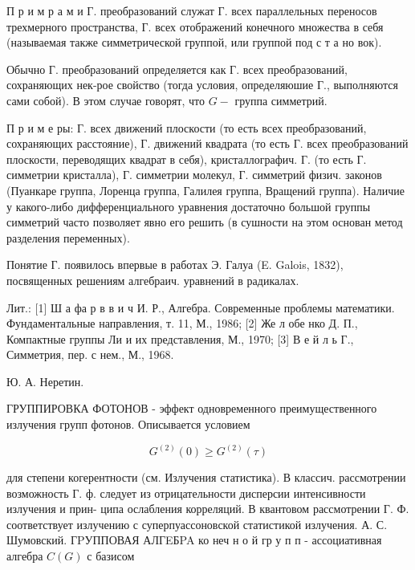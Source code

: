 \documentclass[10pt]{article}
\begin{document}
П р и м р а м и Г. преобразований служат Г. всех параллельных переносов трехмерного пространства, Г. всех отображений конечного множества в себя (называемая также симметрической группой, или группой под с т а но вок).



Обычно Г. преобразований определяется как Г. всех преобразований, сохраняющих нек-рое свойство (тогда условия, определяюшие Г., выполняются сами собой). В этом случае говорят, что $G-$ группа симметрий.



П р и м е ры: Г. всех движений плоскости (то есть всех преобразований, сохраняющих расстояние), Г. движений квадрата (то есть Г. всех преобразований плоскости, переводящих квадрат в себя), кристаллографич. Г. (то есть Г. симметрии кристалла), Г. симметрии молекул, Г. симметрий физич. законов (Пуанкаре группа, Лоренца группа, Галилея группа, Вращений группа). Наличие у какого-либо дифференциального уравнения достаточно большой группы симметрий часто позволяет явно его решить (в сушности на этом основан метод разделения переменных).



Понятие Г. появилось впервые в работах Э. Галуа (E. Galois, 1832), посвященных решениям алгебраич. уравнений в радикалах.



Лит.: [1] Ш а фа р в в и ч И. Р., Алгебра. Современные проблемы математики. Фундаментальные направления, т. 11, М., 1986; [2] Же л обе нко Д. П., Компактные группы Ли и их представления, М., 1970; [3] В е й л ь Г., Симметрия, пер. с нем., М., 1968.



Ю. А. Неретин.



ГРУППИРОВКА ФОТОНОВ - эффект одновременного преимущественного излучения групп фотонов. Описывается условием



\[

G^{(2)}(0) \geqslant G^{(2)}(\tau)

\]



для степени когерентности (см. Излучения статистика). В классич. рассмотрении возможность Г. ф. следует из отрицательности дисперсии интенсивности излучения и прин- ципа ослабления корреляций. В квантовом рассмотрении Г. Ф. соответствует излучению с суперпуассоновской статистикой излучения. А. С. Шумовский. ГPУППОВАЯ АЛГEБPA ко неч н о й гр у п п - ассоциативная алгебра $C(G)$ с базисом
\end{document}
